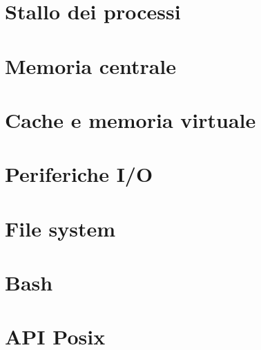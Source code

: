 \documentclass[12pt,a4paper,oneside]{book}
\begin{document}
	\chapter{Stallo dei processi}
	
	\chapter{Memoria centrale}
	
	\chapter{Cache e memoria virtuale}
	
	\chapter{Periferiche I/O}
	
	\chapter{File system}
	
	\chapter{Bash}
	
	\chapter{API Posix}
	
\end{document}
